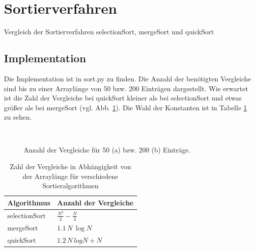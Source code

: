 \documentclass{article}
\begin{document}
\section{Sortierverfahren}

Vergleich der Sortierverfahren selectionSort, mergeSort und quickSort

\subsection{Implementation}
\label{sec:imp}
Die Implementation ist in sort.py zu finden. Die Anzahl der benötigten Vergleiche sind bis zu einer Arraylänge von 50 bzw. 200 Einträgen dargestellt. Wie erwartet ist die Zahl der Vergleiche bei quickSort kleiner als bei selectionSort und etwas größer als bei mergeSort (vgl. Abb. \ref{fig:noc}). Die Wahl der Konstanten ist in Tabelle \ref{tab:func} zu sehen.




\begin{figure}[h!]
\centering
{}
~



\caption{Anzahl der Vergleiche für 50 (a) bzw. 200 (b) Einträge.}
\label{fig:noc}
\end{figure}


\begin{table}[h!]
\centering
\begin{tabular}{|l|l|}
\hline
Algorithmus & Anzahl der Vergleiche \\\hline
selectionSort & $\frac{N^2}{2} -\frac{N}{2}$ \\\hline
mergeSort & $1.1\,N\,\log{N}$ \\\hline
quickSort & $1.2\,N\,log{N} + N$ \\\hline
\end{tabular}

\caption{Zahl der Vergleiche in Abhängigkeit von der Arraylänge für verschiedene Sortieralgorithmen}
\label{tab:func}
\end{table}
\end{document}
